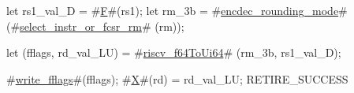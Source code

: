 let rs1_val_D = #\hyperref[sailRISCVzF]{F}#(rs1);
let rm_3b     = #\hyperref[sailRISCVzencdeczyroundingzymode]{encdec\_rounding\_mode}# (#\hyperref[sailRISCVzselectzyinstrzyorzyfcsrzyrm]{select\_instr\_or\_fcsr\_rm}#  (rm));

let (fflags, rd_val_LU) = #\hyperref[sailRISCVzriscvzyf64ToUi64]{riscv\_f64ToUi64}# (rm_3b, rs1_val_D);

#\hyperref[sailRISCVzwritezyfflags]{write\_fflags}#(fflags);
#\hyperref[sailRISCVzX]{X}#(rd) = rd_val_LU;
RETIRE_SUCCESS
